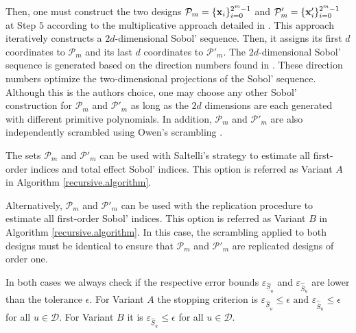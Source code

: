 Then, one must construct the two designs $\mathcal{P}_{m}=\{\boldsymbol{\mathbf{x}}_i\}_{i=0}^{2^{m}-1}$ and $\mathcal{P}'_{m}=\{\boldsymbol{\mathbf{x}}'_i\}_{i=0}^{2^{m}-1}$ at Step $5$ according to the multiplicative approach detailed in \cite{GJAHMP}. {\color{purple}  This approach iteratively constructs a $2d$-dimensional Sobol' sequence. Then, it assigns its first $d$ coordinates to $\mathcal{P}_{m}$ and its last $d$ coordinates to $\mathcal{P}'_{m}$. The $2d$-dimensional Sobol' sequence is generated based on the direction numbers found in \cite{Kuo}. These direction numbers optimize the two-dimensional projections of the Sobol' sequence. Although this is the authors choice, one may choose any other Sobol' construction for $\mathcal{P}_{m}$ and $\mathcal{P}'_{m}$ as long as the $2d$ dimensions are each generated with different primitive polynomials. In addition, $\mathcal{P}_{m}$ and $\mathcal{P}'_{m}$ are also independently scrambled using Owen's scrambling \cite{HonHic00a,Owe95}.}

\bigskip

The sets $\mathcal{P}_{m}$ and $\mathcal{P}'_{m}$ can be used with Saltelli's strategy to estimate all first-order indices and total effect Sobol' indices. This option is referred as Variant $A$ in Algorithm \ref{recursive.algorithm}.

Alternatively, $\mathcal{P}_{m}$ and $\mathcal{P}'_{m}$ can be used with the replication procedure to estimate all first-order Sobol' indices. This option is referred as Variant $B$ in Algorithm \ref{recursive.algorithm}. {\color{purple}  In this case, the scrambling applied to both designs must be identical to ensure that $\mathcal{P}_{m}$ and $\mathcal{P}'_{m}$ are replicated designs of order one.}

In both cases we always check if the respective error bounds $\varepsilon_{\widehat{\underline{S}}_u}$ and $\varepsilon_{\widehat{\overline{S}}_u}$ are lower than the tolerance $\epsilon$. For Variant $A$ the stopping criterion is $\varepsilon_{\widehat{\underline{S}}_u} \leq \epsilon \text{ and } \varepsilon_{\widehat{\overline{S}}_u} \leq \epsilon$ for all $ u \in \mathcal{D}$. For Variant $B$ it is $\varepsilon_{\widehat{\underline{S}}_u} \leq \epsilon$ for all $ u \in \mathcal{D}$. 

